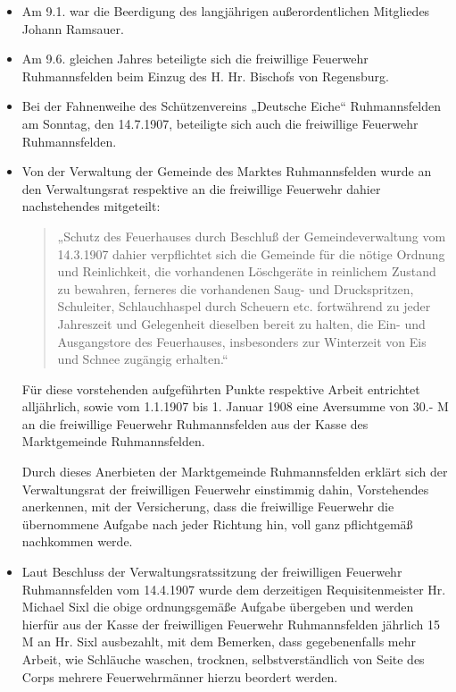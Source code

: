 \documentclass[12pt,a4paper]{book}
\begin{document}
\begin{itemize}
\item Am 9.1. war die Beerdigung des langjährigen außerordentlichen
Mitgliedes
Johann Ramsauer.

\item Am 9.6. gleichen Jahres beteiligte sich die freiwillige Feuerwehr
Ruhmannsfelden beim Einzug des H. Hr. Bischofs von Regensburg.

\item Bei der Fahnenweihe des Schützenvereins „Deutsche Eiche“
Ruhmannsfelden am Sonntag, den 14.7.1907, beteiligte sich auch die
freiwillige Feuerwehr Ruhmannsfelden.

\item Von der Verwaltung der Gemeinde des Marktes Ruhmannsfelden wurde
an den Verwaltungsrat respektive an die freiwillige Feuerwehr dahier
nachstehendes mitgeteilt:


\begin{quote}
„Schutz des Feuerhauses durch Beschluß der Gemeindeverwaltung vom
14.3.1907 dahier verpflichtet sich die Gemeinde für die nötige Ordnung
und Reinlichkeit, die vorhandenen Löschgeräte in reinlichem Zustand zu
bewahren, ferneres die vorhandenen Saug- und Druckspritzen, Schuleiter,
Schlauchhaspel durch Scheuern etc. fortwährend zu jeder Jahreszeit und
Gelegenheit dieselben bereit zu halten, die Ein- und Ausgangstore des
Feuerhauses, insbesonders zur Winterzeit von Eis und Schnee zugängig
erhalten.“
\end{quote}

Für diese vorstehenden aufgeführten Punkte respektive Arbeit entrichtet
alljährlich, sowie vom 1.1.1907 bis 1. Januar 1908 eine Aversumme von
30.- M an die freiwillige Feuerwehr Ruhmannsfelden aus der Kasse des
Marktgemeinde Ruhmannsfelden.

Durch dieses Anerbieten der Marktgemeinde Ruhmannsfelden erklärt sich
der Verwaltungsrat der freiwilligen Feuerwehr einstimmig dahin,
Vorstehendes anerkennen, mit der Versicherung, dass die freiwillige
Feuerwehr die übernommene Aufgabe nach jeder Richtung hin, voll ganz
pflichtgemäß nachkommen werde.

\item Laut Beschluss der Verwaltungsratssitzung der freiwilligen
Feuerwehr Ruhmannsfelden vom 14.4.1907 wurde dem derzeitigen
Requisitenmeister Hr. Michael Sixl die obige ordnungsgemäße Aufgabe
übergeben und werden hierfür aus der Kasse der freiwilligen Feuerwehr
Ruhmannsfelden jährlich 15 M an Hr. Sixl ausbezahlt, mit dem Bemerken,
dass gegebenenfalls mehr Arbeit, wie Schläuche waschen, trocknen,
selbstverständlich von Seite des Corps mehrere Feuerwehrmänner hierzu
beordert werden.


\end{itemize}
\end{document}
